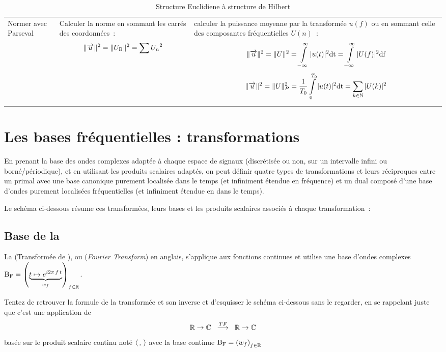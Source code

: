 \begin{table}[!ht]
\begin{tabular}{p{}|p{}|p{}}
  Normer avec Parseval  &  Calculer la norme en sommant les carrés des coordonnées~: $$\|\overrightarrow{u}\|^2=\|U_{\mathrm{B}}\|^2=\sum {U_n}^2$$ &  calculer la puissance moyenne par la transformée $u(f)$ ou en sommant celle des composantes fréquentielles $U(n)$~: $$\|\overrightarrow{u}\|^2=\|U\|^2=\int\limits_{-\infty}^{\infty}{|u(t)|^2\mathrm{d{t}}}=\int\limits_{-\infty}^{\infty}{|U(f)|^2\mathrm{d{f}}} $$  $$\|\overrightarrow{u}\|^2=\|U\|_P^2=\frac{1}{T_0}\int\limits_{0}^{T_0}{|u(t)|^2\mathrm{d{t}}}=\sum\limits_{k\in\mathbb{N}}{|U(k)|^2} $$
\end{tabular}

\caption{Structure Euclidiene à structure de Hilbert}
\label{tab:hilbert}
\end{table}

\section{Les bases fréquentielles : transformations}

En prenant la base des ondes complexes adaptée à chaque espace de
signaux (discrétisée ou non, sur un intervalle infini ou
borné/périodique), et en utilisant les produits scalaires adaptés, on
peut définir quatre types de transformations et leurs réciproques entre
un primal avec une base canonique purement localisée dans le temps (et
infiniment étendue en fréquence) et un dual composé d'une base d'ondes
purement localisées fréquentielles (et infiniment étendue en dans le
temps).

Le schéma ci-dessous résume ces transformées, leurs bases et les
produits scalaires associés à chaque transformation~:



\subsection{Base de la \TF{}}

La \TF{} (Transformée de \Fourier), ou \FT{} (\emph{Fourier
  Transform}) en anglais, s'applique aux fonctions continues et utilise
une base d'ondes complexes
$\mathrm{B_F}=\left(\underbrace{t\mapsto e^{i2\pi\,f\,t}}_{w_f}\right)_{f\in\mathbb{R}}$.

\begin{exercice}
Tentez de retrouver la formule de la transformée et son inverse et d'esquisser le schéma ci-dessous sans le regarder, en se rappelant juste que c'est une application de $$\mathbb{R}\rightarrow\mathbb{C}\;\;\overset{TF}{\longrightarrow}\;\;\mathbb{R}\rightarrow\mathbb{C}$$ basée sur le produit scalaire continu noté $\langle\,,\,\rangle$ avec la base continue $\mathrm{B_F}=\left(w_f\right)_{f\in\mathbb{R}}$
\end{exercice}

